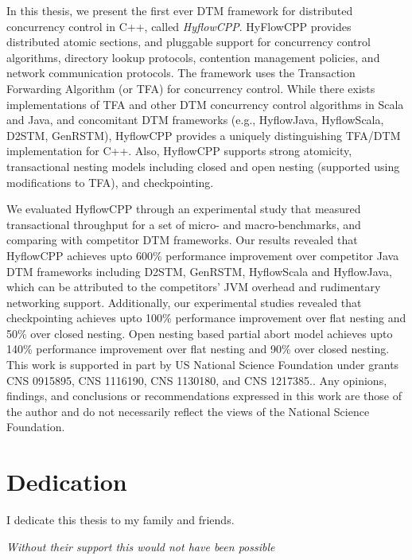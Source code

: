 \documentclass[12pt,english]{report}
\begin{document}
In this thesis, we present the first ever DTM framework for distributed concurrency control in C++, called \textit{HyflowCPP}. HyFlowCPP provides distributed atomic sections, and pluggable support for concurrency control algorithms, directory lookup protocols, contention management policies, and network communication protocols.
The framework uses the Transaction Forwarding Algorithm (or TFA) for concurrency control. While there exists implementations of TFA and other DTM concurrency control algorithms in Scala and Java, and concomitant DTM frameworks (e.g., HyflowJava, HyflowScala, D2STM, GenRSTM), HyflowCPP provides a uniquely distinguishing TFA/DTM implementation for C++. Also, HyflowCPP supports strong atomicity, transactional nesting models including closed and open nesting (supported using modifications to TFA), and checkpointing. 

We evaluated HyflowCPP through an experimental study that measured transactional throughput for a set of micro- and macro-benchmarks, and comparing with competitor DTM frameworks. Our results revealed that HyflowCPP achieves upto 600\% performance improvement over competitor Java DTM frameworks including D2STM, GenRSTM, HyflowScala and HyflowJava, which can be attributed to the competitors' JVM overhead and rudimentary networking support. Additionally, our experimental studies revealed that checkpointing achieves upto 100\% performance improvement over  flat nesting and 50\% over closed nesting. Open nesting based partial abort model achieves upto 140\% performance improvement over flat nesting and 90\% over closed nesting. 
\vfill
This work is supported in part by US National Science Foundation under grants CNS 0915895, CNS 1116190, CNS 1130180, and CNS 1217385.. Any opinions, findings, and conclusions or recommendations expressed in this work are those of the author and do not necessarily reflect the views of the National Science Foundation.


\pagebreak

\chapter*{Dedication}

\begin{center}
I dedicate this thesis to my family and friends.

\textit{Without their support this would not have been possible}

\end{center}
\end{document}
